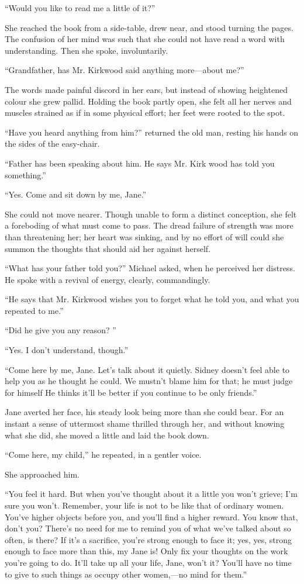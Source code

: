 ``Would you like to read me a little of it?''

She reached the book from a side-table, drew near, and stood turning the
pages. The confusion of her mind was such that she could not have read a
word with understanding. Then she spoke, involuntarily.

{}``Grandfather, has Mr. Kirkwood said anything more---about me?''

The words made painful discord in her ears, but instead of showing
heightened colour she grew pallid. Holding the book partly open, she
felt all her nerves and muscles strained as if in some physical effort;
her feet were rooted to the spot.

``Have you heard anything from him?'' returned the old man, resting his
hands on the sides of the easy-chair.

``Father has been speaking about him. He says Mr. Kirk wood has told you
something.''

``Yes. Come and sit down by me, Jane.''

She could not move nearer. Though unable to form a distinct conception,
she felt a foreboding of what must come to pass. The dread failure of
strength was more than threatening her; her heart was sinking, and by no
effort of will could she summon the thoughts that should aid her against
herself.

``What has your father told you?'' Michael asked, when he perceived her
distress. He spoke with a revival of energy, clearly, commandingly.

``He says that Mr. Kirkwood wishes you to {}forget what he told you, and
what you repeated to me.''

``Did he give you any reason? ''

``Yes. I don't understand, though.''

``Come here by me, Jane. Let's talk about it quietly. Sidney doesn't
feel able to help you as he thought he could. We mustn't blame him for
that; he must judge for himself He thinks it'll be better if you
continue to be only friends.''

Jane averted her face, his steady look being more than she could bear.
For an instant a sense of uttermost shame thrilled through her, and
without knowing what she did, she moved a little and laid the book down.

``Come here, my child,'' he repeated, in a gentler voice.

She approached him.

``You feel it hard. But when you've thought about it a little you won't
grieve; I'm sure you won't. Remember, your life is not to be like that
of ordinary women. You've higher objects before you, and you'll find a
higher reward. You know that, don't you? There's no need for me to
remind you of what we've talked about so often, is there? If it's {}a
sacrifice, you're strong enough to face it; yes, yes, strong enough to
face more than this, my Jane is! Only fix your thoughts on the work
you're going to do. It'll take up all your life, Jane, won't it? You'll
have no time to give to such things as occupy other women,---no mind for
them.''

